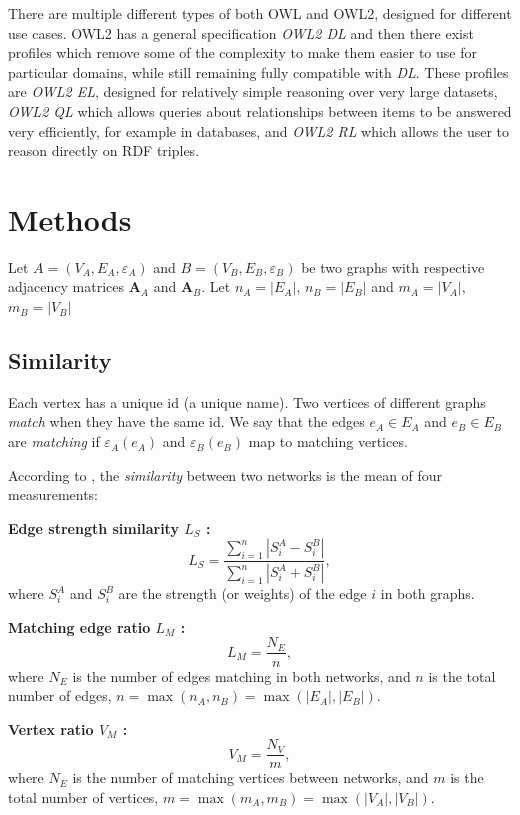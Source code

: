 \documentclass[english, 12pt]{article}
\begin{document}
There are multiple different types of both OWL and OWL2, designed for different use cases. OWL2 has a general specification \emph{OWL2 DL}\cite{w3c_owl2} and then there exist profiles which remove some of the complexity to make them easier to use for particular domains, while still remaining fully compatible with \emph{DL}. These profiles are \emph{OWL2 EL}, designed for relatively simple reasoning over very large datasets, \emph{OWL2 QL} which allows queries about relationships between items to be answered very efficiently, for example in databases, and \emph{OWL2 RL} which allows the user to reason directly on RDF triples.

\section{Methods}


Let $A = (V_A,E_A, \varepsilon_A)$ and $B = (V_B,E_B, \varepsilon_B)$ be two graphs with respective adjacency matrices $\mathbf A_A$ and $\mathbf A_B$.
Let $n_A = |E_A|$, $n_B = |E_B|$ and $m_A = |V_A|$, $m_B = |V_B|$

\subsection{Similarity}\label{ssec:similarity}
Each vertex has a unique id (a unique name). Two vertices of different graphs {\it match} when they have the same id.
We say that the edges $e_A \in E_A$ and $e_B \in E_B$ are {\it matching} if $\varepsilon_A(e_A)$ and $\varepsilon_B(e_B)$ map to matching vertices.

According to \cite{2019osti}, the {\it similarity} between two networks is the mean of four measurements:

{\bf Edge strength similarity $L_S$ :}
\[L_S = \frac{\sum_{i = 1}^n|S_i^A - S_i^B|}{\sum_{i=1}^n|S_i^A + S_i^B|},\]
where $S_i^A$ and $S_i^B$ are the strength (or weights) of the edge $i$ in both graphs.

{\bf Matching edge ratio $L_M$ :}
\[L_M = \frac{N_E}{n},\]
where $N_E$ is the number of edges matching in both networks, and $n$ is the total number of edges, $n = \max(n_A,n_B) = \max(|E_A|, |E_B|)$.

{\bf Vertex ratio $V_M$ :}
\[V_M = \frac{N_V}{m},\]
where $N_E$ is the number of matching vertices between networks, and $m$ is the total number of vertices, $m = \max(m_A,m_B)=  \max(|V_A|, |V_B|)$.
\end{document}
